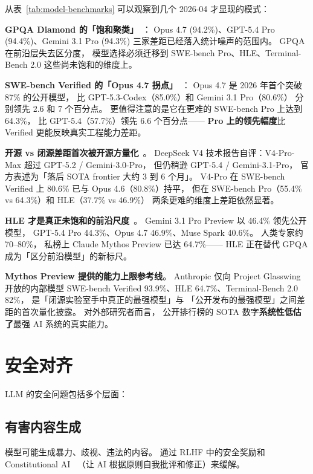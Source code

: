 从表~\ref{tab:model-benchmarks} 可以观察到几个 2026-04 才显现的模式：

\textbf{GPQA Diamond 的「饱和聚类」}~\cite{buildfast2026opus47}：
Opus 4.7 (94.2\%)、GPT-5.4 Pro (94.4\%)、Gemini 3.1 Pro (94.3\%)
三家差距已经落入统计噪声的范围内。
GPQA 在前沿层失去区分度，
模型选择必须迁移到 SWE-bench Pro、HLE、Terminal-Bench 2.0
这些尚未饱和的维度上。

\textbf{SWE-bench Verified 的「Opus 4.7 拐点」}~\cite{tokenmix2026swebench}：
Opus 4.7 是 2026 年首个突破 87\% 的公开模型，
比 GPT-5.3-Codex（85.0\%）和 Gemini 3.1 Pro（80.6\%）
分别领先 2.6 和 7 个百分点。
更值得注意的是它在更难的 SWE-bench Pro 上达到 64.3\%，
比 GPT-5.4（57.7\%）领先 6.6 个百分点——
\textbf{Pro 上的领先幅度}比 Verified 更能反映真实工程能力差距。

\textbf{开源 vs 闭源差距首次被开源方量化}~\cite{morphllm2026deepseekv4}。
DeepSeek V4 技术报告自评：V4-Pro-Max 超过 GPT-5.2 / Gemini-3.0-Pro，
但仍稍逊 GPT-5.4 / Gemini-3.1-Pro，
官方表述为「落后 SOTA frontier 大约 3 到 6 个月」。
V4-Pro 在 SWE-bench Verified 上 80.6\% 已与 Opus 4.6（80.8\%）持平，
但在 SWE-bench Pro（55.4\% vs 64.3\%）和 HLE（37.7\% vs 46.9\%）
两条更难的维度上差距依然显著。

\textbf{HLE 才是真正未饱和的前沿尺度}~\cite{ppt2026hle,aictrl2026reasoning}。
Gemini 3.1 Pro Preview 以 46.4\% 领先公开模型，
GPT-5.4 Pro 44.3\%、Opus 4.7 46.9\%、Muse Spark 40.6\%。
人类专家约 70--80\%，
私榜上 Claude Mythos Preview 已达 64.7\%——
HLE 正在替代 GPQA 成为「区分前沿模型」的新标尺。

\textbf{Mythos Preview 提供的能力上限参考线}。
Anthropic 仅向 Project Glasswing 开放的内部模型
SWE-bench Verified 93.9\%、HLE 64.7\%、Terminal-Bench 2.0 82\%，
是「闭源实验室手中真正的最强模型」与
「公开发布的最强模型」之间差距的首次量化披露。
对外部研究者而言，
公开排行榜的 SOTA 数字\textbf{系统性低估了}最强 AI 系统的真实能力。

\section{安全对齐}

LLM 的安全问题包括多个层面：

\subsection{有害内容生成}

模型可能生成暴力、歧视、违法的内容。
通过 RLHF 中的安全奖励和 Constitutional AI~\cite{bai2022constitutional}
（让 AI 根据原则自我批评和修正）来缓解。

